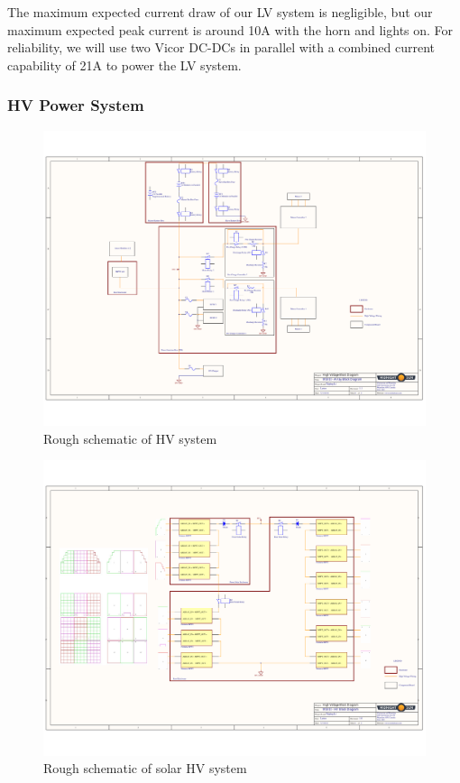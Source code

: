 \documentclass[10pt]{article}
\begin{document}
The maximum expected current draw of our LV system is negligible, but our maximum expected peak current is around 10A with the horn and lights on. For reliability, we will use two Vicor DC-DCs in parallel with a combined current capability of 21A to power the LV system.

\subsubsection{HV Power System}

\begin{figure}[H]
    \centering
    \includegraphics[width=\textwidth]{figures/hv-schematic}
    \caption{Rough schematic of HV system}
    \label{fig:msxii-electrical-hv-system}
\end{figure}

\begin{figure}[H]
    \centering
    \includegraphics[width=\textwidth]{figures/solar-schematic}
    \caption{Rough schematic of solar HV system}
    \label{fig:msxii-electrical-solar-system}
\end{figure}
\end{document}
